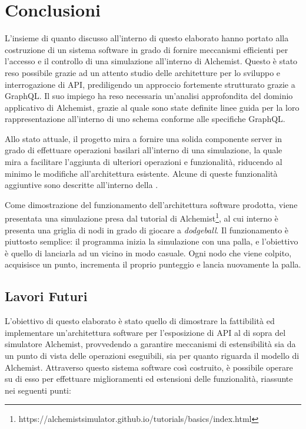 \chapter{Conclusioni}\label{chap:conclusions}
L'insieme di quanto discusso all'interno di questo elaborato hanno portato alla costruzione di un sistema software in grado di fornire meccanismi efficienti per l'accesso
e il controllo di una simulazione all'interno di Alchemist. Questo è stato reso possibile grazie ad un attento studio delle architetture per lo sviluppo e interrogazione
di \ac{API}, prediligendo un approccio fortemente strutturato grazie a GraphQL. Il suo impiego ha reso necessaria un'analisi approfondita del dominio applicativo di Alchemist,
grazie al quale sono state definite linee guida per la loro rappresentazione all'interno di uno schema conforme alle specifiche GraphQL.

Allo stato attuale, il progetto mira a fornire una solida componente server in grado di effettuare operazioni basilari all'interno di una simulazione, la quale mira a facilitare
l'aggiunta di ulteriori operazioni e funzionalità, riducendo al minimo le modifiche all'architettura esistente. Alcune di queste funzionalità aggiuntive sono descritte all'interno
della .

Come dimostrazione del funzionamento dell'architettura software prodotta, viene presentata una simulazione presa dal tutorial di Alchemist\footnote{https://alchemistsimulator.github.io/tutorials/basics/index.html},
al cui interno è presenta una griglia di nodi in grado di giocare a \textit{dodgeball}. Il funzionamento è piuttosto semplice: il programma inizia la simulazione con una
palla, e l'obiettivo è quello di lanciarla ad un vicino in modo casuale. Ogni nodo che viene colpito, acquisisce un punto, incrementa il proprio punteggio e lancia nuovamente la palla.


\section{Lavori Futuri}\label{sec:future-works}
L'obiettivo di questo elaborato è stato quello di dimostrare la fattibilità ed implementare un'architettura software per l'esposizione di \ac{API} al di sopra del simulatore Alchemist,
provvedendo a garantire meccanismi di estensibilità sia da un punto di vista delle operazioni eseguibili, sia per quanto riguarda il modello di Alchemist.
Attraverso questo sistema software così costruito, è possibile operare su di esso per effettuare miglioramenti ed estensioni delle funzionalità, riassunte nei seguenti punti:

